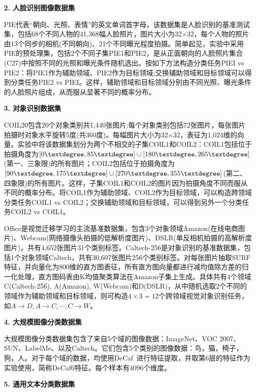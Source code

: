 \textbf{2. 人脸识别图像数据集}

PIE代表“朝向、光照、表情”的英文单词首字母，该数据集是人脸识别的基准测试集，包括68个不同人物的41,368幅人脸照片，图片大小为32$\times$32，每个人物的照片由13个同步的相机(不同朝向)、21个不同曝光程度拍摄。简单起见，实验中采用PIE的预处理集，包括2个不同子集PIE1和PIE2，是从正面朝向的人脸照片集合(C27)中按照不同的光照和曝光条件随机选出。按如下方法构造分类任务PIEI vs PIE2：将PIE1作为辅助领域、PIE2作为目标领域;交换辅助领域和目标领域可以得到分类任务PIE2 vs PIEI。这样，辅助领域和目标领域分别由不同光照、曝光条件的人脸照片组成，从而服从显著不同的概率分布。

\textbf{3. 对象识别数据集}

COIL20包含20个对象类别共1,440张图片;每个对象类别包括72张图片，每张图片拍摄时对象水平旋转5度(共360度)。每幅图片大小为32$\times$32，表征为1,024维的向量。实验中将该数据集划分为两个不相交的子集COIL1和COIL2：COIL1包括位于拍摄角度为$[0\textdegree,85\textdegree]\cup[180\textdegree,265\textdegree]$(第一、三象限)的所有图片；COIL2包括位于拍摄角度为$[90\textdegree,175\textdegree]\cup[270\textdegree,355\textdegree]$(第二、四象限)的所有图片。这样，子集COIL1和COIL2的图片因为拍摄角度不同而服从不同的概率分布。将COIL1作为辅助领域、COIL2作为目标领域，可以构造跨领域分类任务COIL1 vs COIL2；交换辅助领域和目标领域，可以得到另外一个分类任务COIL2 vs COIL1。

Office是视觉迁移学习的主流基准数据集，包含3个对象领域Amazon(在线电商图片)、Webcam(网络摄像头拍摄的低解析度图片)、DSLR(单反相机拍摄的高解析度图片)，共有4,652张图片31个类别标签。Caltech-256是对象识别的基准数据集，包括1个对象领域Caltech，共有30,607张图片256个类别标签。对每张图片抽取SURF特征，并向量化为800维的直方图表征，所有直方图向量都进行减均值除方差的归一化处理，直方图码表由K均值聚类算法在Amazon子集上生成。具体共有4个领域C(Caltech-256), A(Amazon), W(Webcam)和D(DSLR)，从中随机选取2个不同的领域作为辅助领域和目标领域，则可构造$4 \times 3 = 12$个跨领域视觉对象识别任务，如$A \rightarrow D, A \rightarrow C, \cdots, C \rightarrow W$。

\textbf{4. 大规模图像分类数据集}

大规模图像分类数据集包含了来自5个域的图像数据：ImageNet、VOC 2007、SUN、LabelMe、以及Caltech。它们包含5个类别的图像数据：鸟，猫，椅子，狗，人。对于每个域的数据，均使用DeCaf~\cite{donahue2014decaf}进行特征提取，并取第6层的特征作为实验使用，简称DeCaf6特征。每个样本有4096个维度。

\textbf{5. 通用文本分类数据集}

